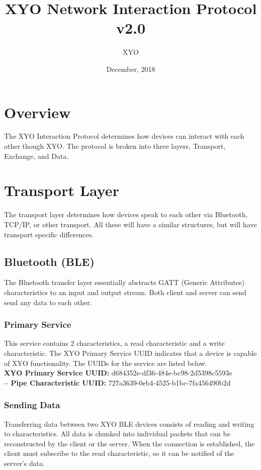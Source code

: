 \documentclass[11pt]{article}
\author{XYO}
\title{XYO Network Interaction Protocol v2.0}
\date{December, 2018}
\begin{document}
\maketitle

\section{Overview}
The XYO Interaction Protocol determines how devices can interact with each other though XYO.
The protocol is broken into three layers, Transport, Exchange, and Data.

\section{Transport Layer}
The transport layer determines how devices speak to each other via Bluetooth, TCP/IP,
or other transport. All these will have a similar structures, but will have transport
specific differences.

\subsection{Bluetooth (BLE)}
The Bluetooth transfer layer essentially abstracts GATT (Generic Attributes) characteristics to an input and output stream. Both client and server can send send any data to each other.

\subsubsection{Primary Service}
This service contains 2 characteristics, a read characteristic and a write characteristic. The XYO Primary Service UUID indicates that a device is capable of XYO functionality. The UUIDs for the service are listed below.\\

\noindent
\textbf{XYO Primary Service UUID:} d684352e-df36-484e-bc98-2d5398c5593e \\
\textbf{-- Pipe Characteristic UUID:} 727a3639-0eb4-4525-b1bc-7fa456490b2d \\

\subsubsection{Sending Data}
Transferring data between two XYO BLE devices consists of reading and writing to characteristics. All data is chunked into individual packets that can be reconstructed by the client or the server. When the connection is established, the client must subscribe to the read characteristic, so it can be notified of the server's data. 
\end{document}
